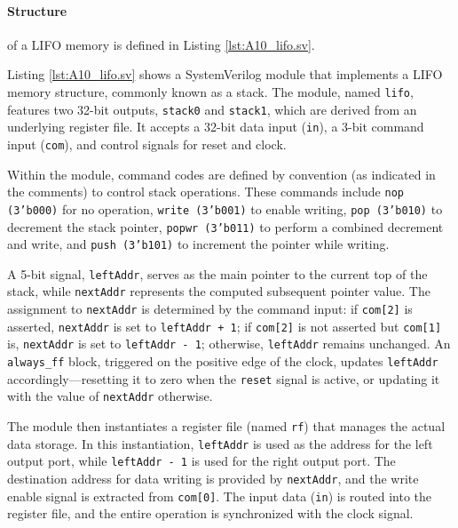 

\paragraph{Structure} of a  LIFO memory is defined in Listing \ref{lst:A10_lifo.sv}.


Listing \ref{lst:A10_lifo.sv} shows a SystemVerilog module that implements a LIFO memory structure, commonly known as a stack. The module, named \texttt{lifo}, features two 32-bit outputs, \texttt{stack0} and \texttt{stack1}, which are derived from an underlying register file. It accepts a 32-bit data input (\texttt{in}), a 3-bit command input (\texttt{com}), and control signals for reset and clock.

Within the module, command codes are defined by convention (as indicated in the comments) to control stack operations. These commands include \texttt{nop (3'b000)} for no operation, \texttt{write (3'b001)} to enable writing, \texttt{pop (3'b010)} to decrement the stack pointer, \texttt{popwr (3'b011)} to perform a combined decrement and write, and \texttt{push (3'b101)} to increment the pointer while writing. 

A 5-bit signal, \texttt{leftAddr}, serves as the main pointer to the current top of the stack, while \texttt{nextAddr} represents the computed subsequent pointer value. The assignment to \texttt{nextAddr} is determined by the command input: if \texttt{com[2]} is asserted, \texttt{nextAddr} is set to \texttt{leftAddr + 1}; if \texttt{com[2]} is not asserted but \texttt{com[1]} is, \texttt{nextAddr} is set to \texttt{leftAddr - 1}; otherwise, \texttt{leftAddr} remains unchanged. An \texttt{always\_ff} block, triggered on the positive edge of the clock, updates \texttt{leftAddr} accordingly—resetting it to zero when the \texttt{reset} signal is active, or updating it with the value of \texttt{nextAddr} otherwise.

The module then instantiates a register file (named \texttt{rf}) that manages the actual data storage. In this instantiation, \texttt{leftAddr} is used as the address for the left output port, while \texttt{leftAddr - 1} is used for the right output port. The destination address for data writing is provided by \texttt{nextAddr}, and the write enable signal is extracted from \texttt{com[0]}. The input data (\texttt{in}) is routed into the register file, and the entire operation is synchronized with the clock signal.

